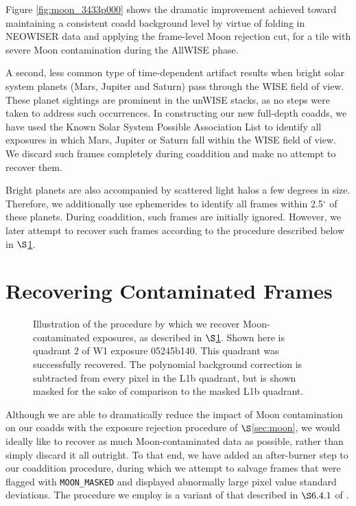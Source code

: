\documentclass{emulateapj}
\begin{document}
Figure \ref{fig:moon_3433p000} shows the dramatic improvement achieved toward 
maintaining a consistent coadd background level by virtue of folding in 
NEOWISER data and applying the frame-level Moon rejection cut, for a tile with 
severe Moon contamination during the AllWISE phase.

A second, less common type of time-dependent artifact results when
bright solar system planets (Mars, Jupiter and Saturn) pass through
the WISE field of view. These planet sightings are prominent in the 
\cite{lang14} unWISE stacks, as no steps were taken to address such
occurrences. In constructing our new full-depth coadds, we have used the Known 
Solar System Possible Association List to identify all exposures in which
Mars, Jupiter or Saturn fall within the WISE field of view. We discard
such frames completely during coaddition and make no attempt to recover them.

Bright planets are also accompanied by scattered light halos a few degrees in 
size. Therefore, we additionally use ephemerides to identify all frames within 
2.5$^{\circ}$ of these planets. During coaddition,
such frames are initially ignored. However, we later attempt to recover such
frames according to the procedure described below in $\S$\ref{sec:recover}.

\section{Recovering Contaminated Frames}
\label{sec:recover}


\begin{figure*}[ht]
 \begin{center}
  \caption{\label{fig:warp_example} Illustration of the procedure by which
           we recover Moon-contaminated exposures, as described in 
           $\S$\ref{sec:recover}. Shown here is quadrant 2
           of W1 exposure 05245b140. This quadrant was successfully recovered.
           The polynomial background correction is subtracted
           from every pixel in the L1b quadrant, but is shown masked
           for the sake of comparison to the masked L1b quadrant.}
 \end{center}
\end{figure*}

Although we are able to dramatically reduce the impact of Moon contamination
on our coadds with the exposure rejection procedure of $\S$\ref{sec:moon},
we would ideally like to recover as much Moon-contaminated data as possible,
rather than simply discard it all outright. To that end, we have added an 
after-burner step to our coaddition procedure, during which we attempt to 
salvage frames that were flagged with \verb|MOON_MASKED| and displayed 
abnormally large pixel value standard deviations. The procedure we employ is a 
variant of that described in $\S6.4.1$ of \cite{meisner14}.
\end{document}
